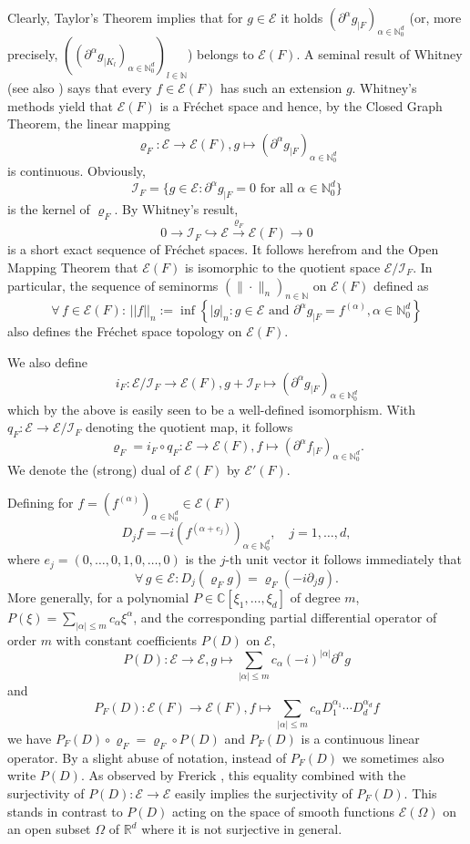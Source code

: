 \documentclass[10pt,leqno]{amsart}
\theoremstyle{definition}
\newcommand{\R}{\mathbb R}
\newcommand{\N}{\mathbb N}
\newcommand{\C}{\mathbb C}
\newcommand{\cI}{\mathcal I}
\let\rho\varrho
\begin{document}
Clearly, Taylor's Theorem implies that for $g\in\mathscr{E}$ it holds $(\partial^\alpha g_{\mid F})_{\alpha\in\N_0^d}$ (or, more precisely, $\left(\left(\partial^{\alpha}g_{\mid K_l}\right)_{\alpha\in\N_0^d}\right)_{l\in\N}$) belongs to $\mathscr{E}(F)$. A seminal result of Whitney \cite{Whitney34} (see also \cite{Malgrange1967}) says that every $f\in\mathscr{E}(F)$ has such an extension $g$. Whitney's methods yield that $\mathscr{E}(F)$ is a Fr\'echet space and hence, by the Closed Graph Theorem, the linear mapping $$\rho_F\colon\mathscr{E}\rightarrow\mathscr{E}(F), g\mapsto (\partial^\alpha g_{\mid F})_{\alpha\in\N_0^d}$$
is continuous. Obviously, 
$$\cI_F=\{g\in\mathscr{E}\colon \partial^\alpha g_{\mid{F}}=0 \text{ for all }\alpha\in\N_0^d\}$$
is the kernel of $\rho_F$. By Whitney's result,
$$0\rightarrow\cI_F\hookrightarrow\mathscr{E}\xrightarrow{\rho_F}\mathscr{E}(F)\rightarrow 0$$
is a short exact sequence of Fr\'echet spaces. It follows herefrom and the Open Mapping Theorem that $\mathscr{E}(F)$ is isomorphic to the quotient space $\mathscr{E}/\cI_F$. In particular, the sequence of seminorms $(\|\cdot\|_n)_{n\in\N}$ on $\mathscr{E}(F)$ defined as
$$\forall\,f\in\mathscr{E}(F)\colon\,||f||_n:=\inf\left\{|g|_{n}\colon g\in\mathscr{E}  \text{ and } \partial^\alpha g_{\mid{F}}=f^{(\alpha)}, \alpha\in\N_0^d\right\}$$
also defines the Fr\'echet space topology on $\mathscr{E}(F)$.

We also define
$$i_F\colon\mathscr{E}/\cI_F\to\mathscr{E}(F), g+\cI_F\mapsto (\partial^\alpha g_{\mid F})_{\alpha\in\N_0^d}$$
which by the above is easily seen to be a well-defined isomorphism. With $q_F:\mathscr{E}\rightarrow\mathscr{E}/\cI_F$ denoting the quotient map, it follows
$$\rho_F=i_F\circ q_F\colon\mathscr{E}\to\mathscr{E}(F), f\mapsto(\partial^\alpha f_{\mid F})_{\alpha\in\N_0^d}.$$
We denote the (strong) dual of $\mathscr{E}(F)$ by $\mathscr{E}'(F)$.

Defining for $f=(f^{(\alpha)})_{\alpha\in\N_0^d}\in\mathscr{E}(F)$
$$D_jf=-i(f^{(\alpha+e_j)})_{\alpha\in\N_0^d}, \quad j=1,\ldots, d,$$
where $e_j=(0,\ldots,0,1,0,\ldots,0)$ is the $j$-th unit vector it follows immediately that
$$\forall\,g\in\mathscr{E}\colon D_j(\rho_F g)=\rho_F\left(-i\partial_j g\right).$$
More generally, for a polynomial $P\in\C[\xi_1,\ldots,\xi_d]$ of degree $m$, $P(\xi)=\sum_{|\alpha|\leq m}c_\alpha \xi^\alpha$, and the corresponding partial differential operator of order $m$ with constant coefficients $P(D)$ on $\mathscr{E}$,
$$P(D)\colon\mathscr{E}\rightarrow\mathscr{E}, g\mapsto\sum_{|\alpha|\leq m}c_\alpha (-i)^{|\alpha|}\partial^\alpha g$$
and
$$P_F(D)\colon \mathscr{E}(F)\rightarrow\mathscr{E}(F), f\mapsto \sum_{|\alpha|\leq m}c_\alpha D_1^{\alpha_1}\cdots D_d^{\alpha_d}f$$
we have $P_F(D)\circ\rho_F=\rho_F\circ P(D)$ and $P_F(D)$ is a continuous linear operator. By a slight abuse of notation, instead of $P_F(D)$ we sometimes also write $P(D)$. As observed by Frerick \cite[Introduction to Chapter 6]{Frerick-Habilitation}, this equality combined with the surjectivity of $P(D)\colon\mathscr{E} \to\mathscr{E} $ easily implies the surjectivity of $P_F(D)$. This stands in contrast to $P(D)$ acting on the space of smooth functions $\mathscr{E}(\Omega)$ on an open subset $\Omega$ of $\R^d$ where it is not surjective in general.
\end{document}
